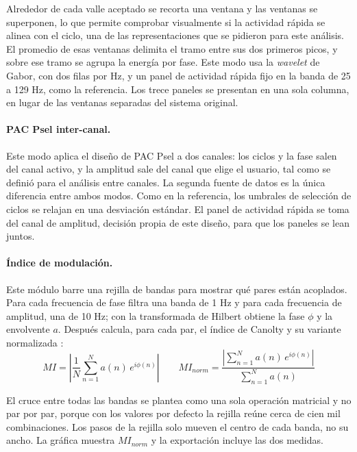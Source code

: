 \documentclass[12pt,letterpaper,oneside]{article}
\begin{document}
Alrededor de cada valle aceptado se recorta una ventana y las ventanas se superponen, lo que permite comprobar visualmente si la actividad rápida se alinea con el ciclo, una de las representaciones que se pidieron para este análisis. El promedio de esas ventanas delimita el tramo entre sus dos primeros picos, y sobre ese tramo se agrupa la energía por fase. Este modo usa la \textit{wavelet} de Gabor, con dos filas por Hz, y un panel de actividad rápida fijo en la banda de 25 a 129 Hz, como la referencia. Los trece paneles se presentan en una sola columna, en lugar de las ventanas separadas del sistema original.

\paragraph{PAC Psel inter-canal.}

Este modo aplica el diseño de PAC Psel a dos canales: los ciclos y la fase salen del canal activo, y la amplitud sale del canal que elige el usuario, tal como se definió para el análisis entre canales. La segunda fuente de datos es la única diferencia entre ambos modos. Como en la referencia, los umbrales de selección de ciclos se relajan en una desviación estándar. El panel de actividad rápida se toma del canal de amplitud, decisión propia de este diseño, para que los paneles se lean juntos.

\paragraph{Índice de modulación.}

Este módulo barre una rejilla de bandas para mostrar qué pares están acoplados. Para cada frecuencia de fase filtra una banda de 1 Hz y para cada frecuencia de amplitud, una de 10 Hz; con la transformada de Hilbert obtiene la fase $\phi$ y la envolvente $a$. Después calcula, para cada par, el índice de Canolty \cite{canolty2006} y su variante normalizada \cite{ozkurt2011}:
\[
  MI = \left|\frac{1}{N}\sum_{n=1}^{N} a(n)\,e^{i\phi(n)}\right|
  \qquad
  MI_{norm} = \frac{\left|\sum_{n=1}^{N} a(n)\,e^{i\phi(n)}\right|}{\sum_{n=1}^{N} a(n)}
\]

El cruce entre todas las bandas se plantea como una sola operación matricial y no par por par, porque con los valores por defecto la rejilla reúne cerca de cien mil combinaciones. Los pasos de la rejilla solo mueven el centro de cada banda, no su ancho. La gráfica muestra $MI_{norm}$ y la exportación incluye las dos medidas.
\end{document}
